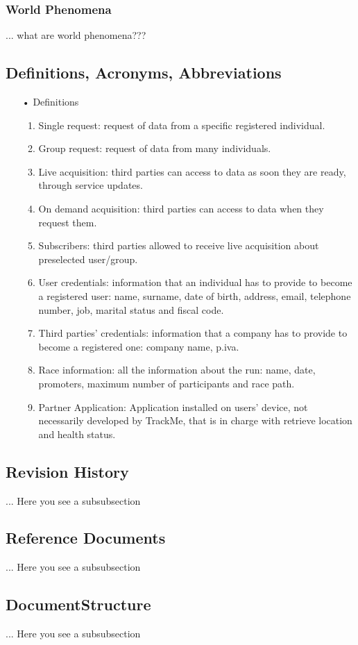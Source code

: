 \subsubsection{World Phenomena}
... what are world phenomena???

\subsection{Definitions, Acronyms, Abbreviations}

\begin{enumerate}
\item[•] {\Large Definitions}
	\begin{enumerate}
		\item Single request: request of data from a specific registered individual.
		\item Group request: request of data from many individuals. 
		\item Live acquisition: third parties can access to data as soon they are ready, 				through service updates.
		\item On demand acquisition: third parties can access to data when they request 				them.
		\item Subscribers: third parties allowed to receive live acquisition about 						preselected	user/group.
		\item User credentials: information that an individual has to provide to become a 				registered user: name, surname, date of birth, address, email, telephone
			number, job, marital status and fiscal code. 
		\item Third parties' credentials: information that a company has to provide to 					become a registered one: company name, p.iva.
		\item Race information: all the information about the run: name, date, promoters, 				maximum number of participants and race path.
		\item Partner Application: Application installed on users' device, not necessarily developed by TrackMe, that is in charge with retrieve location and health status.
	\end{enumerate}
\end{enumerate}
	
\subsection{Revision History}
... Here you see a subsubsection
\subsection{Reference Documents}
... Here you see a subsubsection
\subsection{DocumentStructure}
... Here you see a subsubsection

